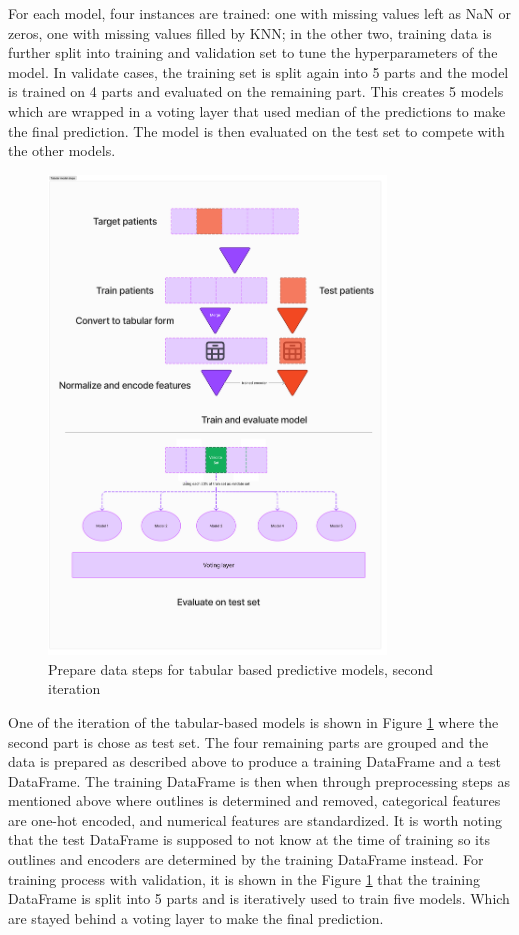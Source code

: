 \documentclass[../main.tex]{subfiles}
\begin{document}
For each model, four instances are trained: one with missing values left as NaN or zeros, one with missing values filled by KNN; in the other two, training data is further split into training and validation set to tune the hyperparameters of the model.
In validate cases, the training set is split again into 5 parts and the model is trained on 4 parts and evaluated on the remaining part.
This creates 5 models which are wrapped in a voting layer that used median of the predictions to make the final prediction.
The model is then evaluated on the test set to compete with the other models.

\begin{figure}[h]
    \centering
    \includegraphics[width=0.8\textwidth]{Figure/Tabular Steps.png}
    \caption{Prepare data steps for tabular based predictive models, second iteration}
    \label{fig:tabular-steps}
\end{figure}

One of the iteration of the tabular-based models is shown in Figure \ref{fig:tabular-steps} where the second part is chose as test set.
The four remaining parts are grouped and the data is prepared as described above to produce a training DataFrame and a test DataFrame.
The training DataFrame is then when through preprocessing steps as mentioned above where outlines is determined and removed, categorical features are one-hot encoded, and numerical features are standardized.
It is worth noting that the test DataFrame is supposed to not know at the time of training so its outlines and encoders are determined by the training DataFrame instead.
For training process with validation, it is shown in the Figure \ref{fig:tabular-steps} that the training DataFrame is split into 5 parts and is iteratively used to train five models.
Which are stayed behind a voting layer to make the final prediction. 
\end{document}
